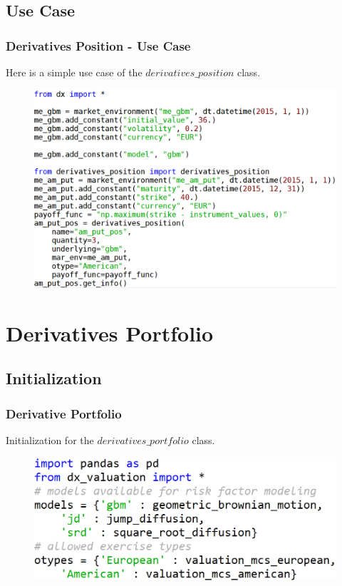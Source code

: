 \documentclass{beamer}
\begin{document}
\subsection{Use Case}
\begin{frame}
\frametitle{Derivatives Position - Use Case}
Here is a simple use case of the $derivatives\_position$ class.
\begin{figure}[H]
	\includegraphics[scale=0.37]{derivatives_position_use_case.png}
\end{figure}
\end{frame}

\section{Derivatives Portfolio}
\subsection{Initialization}
\begin{frame}
\frametitle{Derivative Portfolio}
Initialization for the $derivatives\_portfolio$ class.
\begin{figure}
	\includegraphics[scale=0.45]{derivatives_portfolio_init.png}
\end{figure}
\end{frame}
\end{document}
